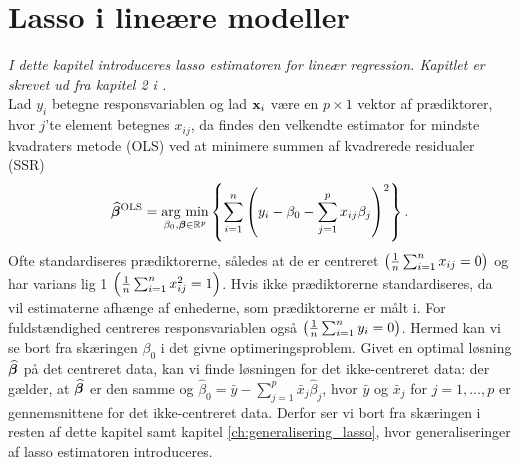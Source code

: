 \chapter{Lasso i lineære modeller} \label{ch:lasso}
\textit{I dette kapitel introduceres lasso estimatoren for lineær regression. 
Kapitlet er skrevet ud fra kapitel 2 i \citep{hastie}.
} \\[4mm]
%
Lad \(y_i\) betegne responsvariablen og lad \(\mathbf{x}_i\) være en \(p \times 1\) vektor af prædiktorer, hvor \(j\)'te element betegnes \(x_{ij}\), da findes den velkendte estimator for mindste kvadraters metode (OLS) ved at minimere summen af kvadrerede residualer (SSR)
\begin{align}
\widehat{\tbeta}^\text{OLS} = \argmin_{\beta_0, \tbeta \in \R^p} \cbr{\sum_{i=1}^n \del{y_i - \beta_0 - \sum_{j=1}^p x_{ij} \beta_j}^2}. \label{eq:OLS}
\end{align}
%
Ofte standardiseres prædiktorerne, således at de er centreret \( \del{\frac{1}{n} \sum_{i=1}^n x_{ij} = 0}\) og har varians lig 1 \( \del{\frac{1}{n} \sum_{i=1}^n x_{ij}^2=1}\).
Hvis ikke prædiktorerne standardiseres, da vil estimaterne afhænge af enhederne, som prædiktorerne er målt i.
For fuldstændighed centreres responsvariablen også \( \del{\frac{1}{n} \sum_{i=1}^n y_{i} = 0} \).
Hermed kan vi se bort fra skæringen $\beta_0$ i det givne optimeringsproblem.
Givet en optimal løsning \(\widehat{\boldsymbol{\beta}}\) på det centreret data, kan vi finde løsningen for det ikke-centreret data: der gælder, at \(\widehat{\boldsymbol{\beta}}\) er den samme og 
\(\widehat{\beta}_0 = \bar{y} - \sum_{j=1}^p \bar{x}_j \widehat{\beta}_j\), hvor \(\bar{y}\) og \(\bar{x}_j \) for \(j=1, \ldots, p\) er gennemsnittene for det ikke-centreret data.
Derfor ser vi bort fra skæringen i resten af dette kapitel samt kapitel \ref{ch:generalisering_lasso}, hvor generaliseringer af lasso estimatoren introduceres.

